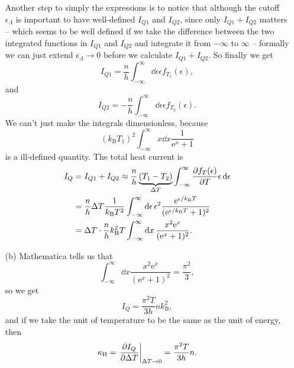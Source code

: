 \documentclass[hyperref, a4paper]{article}
\newcommand*{\ee}{\mathrm{e}}
\begin{document}
\begin{itemize}
Another step to simply the expressions is to notice that 
although the cutoff $\epsilon_\Lambda$ is important to have well-defined $I_{Q1}$ and $I_{Q2}$,
since only $I_{Q1} + I_{Q2}$ matters 
-- which seems to be well defined 
if we take the difference between the two integrated functions in $I_{Q1}$ and $I_{Q2}$ 
and integrate it from $-\infty$ to $\infty$ -- 
formally we can just extend $\epsilon_\Lambda \to 0$ before we calculate $I_{Q1} + I_{Q2}$.
So finally we get 
\begin{equation}
    I_{Q1} = \frac{n}{h} \int^\infty_{-\infty} \dd{\epsilon} \epsilon f_{T_1}(\epsilon) , 
\end{equation}
and 
\begin{equation}
    I_{Q2} = - \frac{n}{h} \int^\infty_{-\infty} \dd{\epsilon} \epsilon f_{T_2}(\epsilon).
\end{equation}
We can't just make the integrals dimensionless, because 
\[
    (k_{\text{B}} T_1)^2 \int^\infty_{-\infty} x \dd{x} \frac{1}{\ee^{x} + 1}
\]
is a ill-defined quantity.
The total heat current is 
\begin{equation}
    \begin{aligned}
        I_Q &= I_{Q1} + I_{Q2} \approx
        \frac{n}{h} \underbrace{(T_1 - T_2)}_{\Delta T} \int^\infty_{-\infty} \pdv{f_T(\epsilon)}{T} \epsilon \dd{\epsilon} \\
        &= \frac{n}{h} \Delta T \frac{1}{k_{\text{B}} T^2} 
        \int^\infty_{-\infty} \dd{\epsilon} \epsilon^2 \frac{\ee^{\epsilon / k_{\text{B}} T}}{(\ee^{\epsilon / k_{\text{B}} T} + 1)^2} \\
        &= \Delta T \cdot \frac{n}{h} k_{\text{B}}^2 T 
        \int^\infty_{-\infty}  \dd{x} \frac{x^2 \ee^x}{(\ee^x + 1)^2}.
    \end{aligned}
    \label{eq:delta-t-i-q}
\end{equation}

\item[(b)] Mathematica tells us that  
\begin{equation}
    \int^\infty_{-\infty}  \dd{x} \frac{x^2 \ee^x}{(\ee^x + 1)^2} = \frac{\pi^2}{3},
\end{equation}
so we get 
\begin{equation}
    I_Q = \frac{\pi^2 T}{3h} n k_{\text{B}}^2,
\end{equation}
and if we take the unit of temperature to be the same as the unit of energy, then 
\begin{equation}
    \kappa_{\text{H}} = \eval{\pdv{I_Q}{\Delta T}}_{\Delta T \to 0} = \frac{\pi^2 T}{3h} n.
\end{equation}


\end{itemize}
\end{document}
